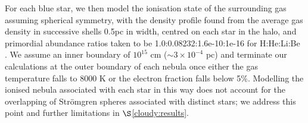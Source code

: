 \documentclass[twocolumn,iop,revtex4]{openjournal}
\begin{document}
For each blue star, we then model the ionisation state of the surrounding gas assuming spherical
symmetry, with the density profile found from the average gas density in successive shells 0.5pc
in width, centred on each star in the halo, and primordial abundance ratios taken to be
1.0:0.08232:1.6e-10:1e-16 for H:He:Li:Be \citep[consistent with the results of the][table 2, see
  {\sc cloudy} documentation for further discussion]{Planck_2014}. We assume an inner boundary
of $10^{15}$ cm ($\sim 3 \times 10^{-4}$ pc) and terminate our calculations at the outer boundary of
each nebula once either the gas temperature falls to 8000 K or the electron fraction falls below 5\%.
Modelling the ionised nebula associated with each star in this way does not account for the
overlapping of Str{\"o}mgren spheres associated with distinct stars; we address this point and
further limitations in $\S$\ref{cloudy:results}.
\end{document}
